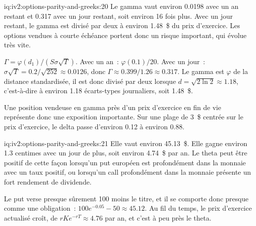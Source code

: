 \begin{solution}{iq:iv2:options-parity-and-greeks:20}
Le gamma vaut environ 0.0198 avec un an restant et 0.317 avec un jour restant, soit environ 16 fois plus. Avec un jour restant, le gamma est divisé par deux à environ 1.48~\$ du prix d'exercice. Les options vendues à courte échéance portent donc un risque important, qui évolue très vite.

$\Gamma = \varphi(d_1)/(S\sigma\sqrt T)$. Avec un an~: $\varphi(0.1)/20$. Avec un jour~: $\sigma\sqrt T = 0.2/\sqrt{252} \approx 0.0126$, donc $\Gamma \approx 0.399/1.26 \approx 0.317$. Le gamma est $\varphi$ de la distance standardisée, il est donc divisé par deux lorsque $d = \sqrt{2\ln 2} \approx 1.18$, c'est-à-dire à environ 1.18 écarts-types journaliers, soit 1.48~\$.

Une position vendeuse en gamma près d'un prix d'exercice en fin de vie représente donc une exposition importante. Sur une plage de 3~\$ centrée sur le prix d'exercice, le delta passe d'environ 0.12 à environ 0.88.

\end{solution}

\begin{solution}{iq:iv2:options-parity-and-greeks:21}
Elle vaut environ 45.13~\$. Elle gagne environ 1.3 centimes avec un jour de plus, soit environ 4.74~\$ par an. Le theta peut être positif de cette façon lorsqu'un put européen est profondément dans la monnaie avec un taux positif, ou lorsqu'un call profondément dans la monnaie présente un fort rendement de dividende.

Le put verse presque sûrement 100 moins le titre, et il se comporte donc presque comme une obligation~: $100e^{-0.05} - 50 \approx 45.12$. Au fil du temps, le prix d'exercice actualisé croît, de $rKe^{-rT} \approx 4.76$ par an, et c'est à peu près le theta.

\end{solution}

